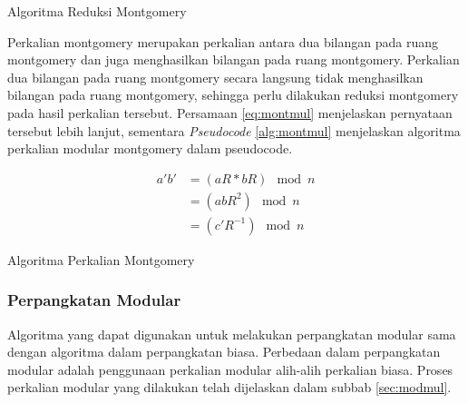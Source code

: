     \begin{algorithm}
      \caption{Algoritma Reduksi Montgomery \citep{montmul_original}}
      \label{alg:mont_redc}
      \begin{algorithmic}[1]
        \Statex

            \EndIf
            \State {}
        \EndFunction
      \end{algorithmic}
    \end{algorithm}

    Perkalian montgomery merupakan perkalian antara dua bilangan pada ruang montgomery dan juga menghasilkan bilangan pada ruang montgomery. Perkalian dua bilangan pada ruang montgomery secara langsung tidak menghasilkan bilangan pada ruang montgomery, sehingga perlu dilakukan reduksi montgomery pada hasil perkalian tersebut. Persamaan \ref{eq:montmul} menjelaskan pernyataan tersebut lebih lanjut, sementara \textit{Pseudocode} \ref{alg:montmul} menjelaskan algoritma perkalian modular montgomery dalam pseudocode.

    \begin{equation} \label{eq:montmul}
        \begin{split}
            a'b' &= (aR * bR) \mod n\\
                 &= (abR^2) \mod n\\
                 &= (c'R^{-1}) \mod n
        \end{split}
    \end{equation}

    \begin{algorithm}
      \caption{Algoritma Perkalian Montgomery \citep{montmul_original}}
      \label{alg:montmul}
      \begin{algorithmic}[1]
        \Statex

            \State {}
        \EndFunction
      \end{algorithmic}
    \end{algorithm}

    \subsubsection{Perpangkatan Modular}
    Algoritma yang dapat digunakan untuk melakukan perpangkatan modular sama dengan algoritma dalam perpangkatan biasa. Perbedaan dalam perpangkatan modular adalah penggunaan perkalian modular alih-alih perkalian biasa. Proses perkalian modular yang dilakukan telah dijelaskan dalam subbab \ref{sec:modmul}.

